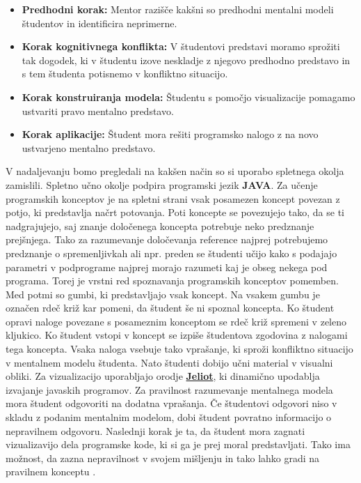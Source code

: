 \begin{itemize}
\item \textbf{Predhodni korak:} Mentor razišče kakšni so predhodni
 mentalni modeli študentov in identificira neprimerne.
\item \textbf{Korak kognitivnega konflikta:} V študentovi predstavi
  moramo sprožiti tak dogodek, ki v študentu izove neskladje z njegovo
  predhodno predstavo in s tem študenta potisnemo v konfliktno
  situacijo.
\item \textbf{Korak konstruiranja modela:} Študentu s pomočjo
  visualizacije pomagamo ustvariti pravo mentalno predstavo.
\item \textbf{Korak aplikacije: } Študent mora rešiti programsko
  nalogo z na novo ustvarjeno mentalno predstavo.
\end{itemize}

V nadaljevanju bomo pregledali na kakšen način so si uporabo spletnega
okolja zamislili.  Spletno učno okolje podpira programski jezik
\textbf{JAVA}. Za učenje programskih konceptov je na spletni strani
vsak posamezen koncept povezan z potjo, ki predstavlja načrt
potovanja. Poti koncepte se povezujejo tako, da se ti nadgrajujejo,
saj znanje določenega koncepta potrebuje neko predznanje
prejšnjega. Tako za razumevanje določevanja reference najprej
potrebujemo predznanje o spremenljivkah ali npr. preden se študenti
učijo kako s podajajo parametri v podprograme najprej morajo razumeti
kaj je obseg nekega pod programa. Torej je vrstni red spoznavanja
programskih konceptov pomemben. Med potmi so gumbi, ki predstavljajo
vsak koncept. Na vsakem gumbu je označen rdeč križ kar pomeni, da
študent še ni spoznal koncepta. Ko študent opravi naloge povezane s
posameznim konceptom se rdeč križ spremeni v zeleno kljukico. Ko
študent vstopi v koncept se izpiše študentova zgodovina z nalogami
tega koncepta. Vsaka naloga vsebuje tako vprašanje, ki sproži
konfliktno situacijo v mentalnem modelu študenta. Nato študenti dobijo
učni material v visualni obliki. Za vizualizacijo uporabljajo orodje
\href{https://cs.joensuu.fi/jeliot/}{\textbf{Jeliot}}, ki dinamično
upodablja izvajanje javaskih programov. Za pravilnost razumevanje
mentalnega modela mora študent odgovoriti na dodatna vprašanja. Če
študentovi odgovori niso v skladu z podanim mentalnim modelom, dobi
študent povratno informacijo o nepravilnem odgovoru. Naslednji korak
je ta, da študent mora zagnati vizualizavijo dela programske kode, ki
si ga je prej moral predstavljati. Tako ima možnost, da zazna
nepravilnost v svojem mišljenju in tako lahko gradi na pravilnem
konceptu \cite{mentalModels}.

